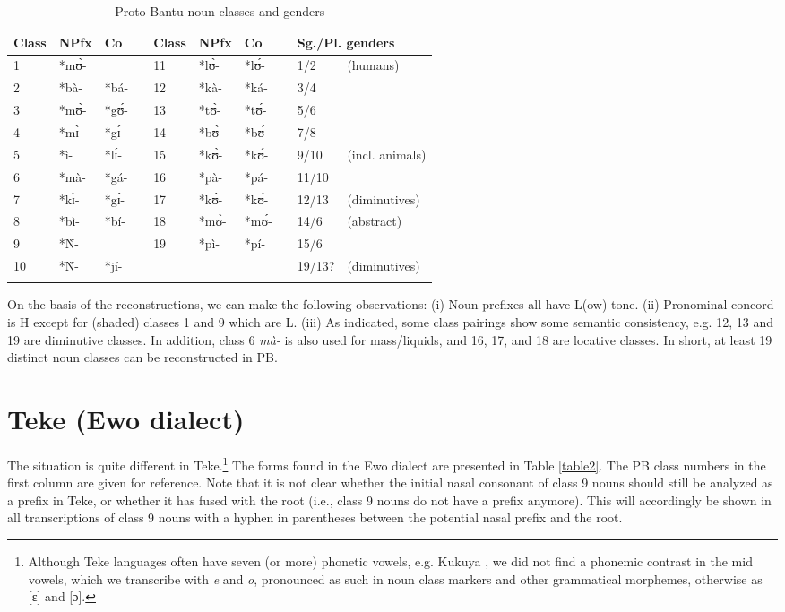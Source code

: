 \documentclass[output=paper,,modfonts,nonflat]{langsci/langscibook-Hyman-et-al}
\begin{document}
\begin{table}[!htbp]
\caption{Proto-Bantu noun classes and genders}
\begin{small}
\label{table1}
\begin{tabular}{l		l		l		l		l		l		l		l	|	l		l }
\lsptoprule
Class	&	NPfx	&	Co	&		&	Class	&	NPfx	&	Co	&		&	\multicolumn{2}{l}{Sg./Pl. genders}			\\	
\midrule
1	&	*mʊ̀-	&	\higr{*ʊ̀-}	&		&	11	&	*lʊ̀-	&	*lʊ́-	&		&	1/2	&	(humans)	\\	
2	&	*bà-	&	*bá-	&		&	12	&	*kà-	&	*ká-	&		&	3/4	&		\\	
3	&	*mʊ̀-	&	*gʊ́-	&		&	13	&	*tʊ̀-	&	*tʊ́-	&		&	5/6	&		\\	
4	&	*mɪ̀-	&	*gɪ́-	&		&	14	&	*bʊ̀-	&	*bʊ́-	&		&	7/8	&		\\	
5	&	*ì-	&	*lɪ́-	&		&	15	&	*kʊ̀-	&	*kʊ́-	&		&	9/10	&	(incl. animals)	\\	
6	&	*mà-	&	*gá-	&		&	16	&	*pà-	&	*pá-	&		&	11/10	&		\\	
7	&	*kɪ̀-	&	*gɪ́-	&		&	17	&	*kʊ̀-	&	*kʊ́-	&		&	12/13	&	(diminutives)	\\	
8	&	*bì-	&	*bí-	&		&	18	&	*mʊ̀-	&	*mʊ́-	&		&	14/6	&	(abstract)	\\	
9	&	*Ǹ-	&	\higr{*jɪ̀-}	&		&	19	&	*pì-	&	*pí-	&		&	15/6	&		\\	
10	&	*Ǹ-	&	*jí-	&		&		&		&		&		&	19/13?	&	(diminutives)	\\	\lspbottomrule
\end{tabular}
\end{small}
\end{table}


On the basis of the reconstructions, we can make the following observations: (i) Noun prefixes all have L(ow) tone. (ii) Pronominal concord is H except for (shaded) classes 1 and 9 which are L. (iii) As indicated, some class pairings show some semantic consistency, e.g. 12, 13 and 19 are diminutive classes. In addition, class 6 \textit{mà-} is also used for mass/liquids, and 16, 17, and 18 are locative classes. In short, at least 19 distinct noun classes can be reconstructed in PB.

 
\section{Teke (Ewo dialect)} 
\label{3-Teke}

The situation is quite different in Teke.\footnote{Although Teke languages often have seven (or more) phonetic vowels, e.g. Kukuya \citep{paulian1975}, we did not find a phonemic contrast in the mid vowels, which we transcribe with \emph{e} and \emph{o}, pronounced as such in noun class markers and other grammatical morphemes, otherwise as [ɛ] and [ɔ].} The forms found in the Ewo dialect are presented in Table \ref{table2}. The PB class numbers in the first column are given for reference. Note that it is not clear whether the initial nasal consonant of class 9 nouns should still be analyzed as a prefix in Teke, or whether it has fused with the root (i.e., class 9 nouns do not have a prefix anymore). This will accordingly be shown in all transcriptions of class 9 nouns with a hyphen in parentheses between the potential nasal prefix and the root.
\end{document}

